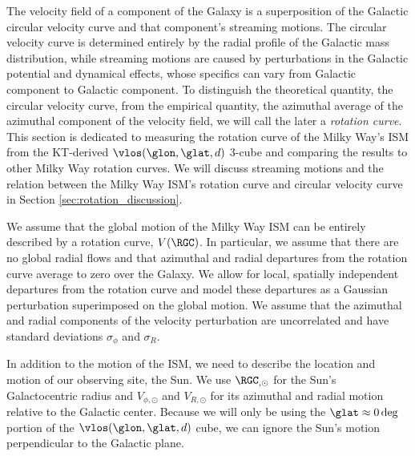 The velocity field of a component of the Galaxy is a superposition of the Galactic circular velocity curve and that component's streaming motions. 
The circular velocity curve is determined entirely by the radial profile of the Galactic mass distribution, while streaming motions are caused by perturbations in the Galactic potential and dynamical effects, whose specifics can vary from Galactic component to Galactic component. 
To distinguish the theoretical quantity, the circular velocity curve, from the empirical quantity, the azimuthal average of the azimuthal component of the velocity field, we will call the later a \emph{rotation curve}. 
This section is dedicated to measuring the rotation curve of the Milky Way's ISM from the KT-derived $\vlos(\glon, \glat, d)$ 3-cube and comparing the results to other Milky Way rotation curves. 
We will discuss streaming motions and the relation between the Milky Way ISM's rotation curve and circular velocity curve in Section \ref{sec:rotation_discussion}.

We assume that the global motion of the Milky Way ISM can be entirely described by a rotation curve, $V(\RGC)$. 
In particular, we assume that there are no global radial flows and that azimuthal and radial departures from the rotation curve average to zero over the Galaxy.
We allow for local, spatially independent departures from the rotation curve and model these departures as a Gaussian perturbation superimposed on the global motion. 
We assume that the azimuthal and radial components of the velocity perturbation are uncorrelated and have standard deviations $\sigma_\phi$ and $\sigma_R$.

In addition to the motion of the ISM, we need to describe the location and motion of our observing site, the Sun. 
We use $\RGC_{, \odot}$ for the Sun's Galactocentric radius and $V_{\phi, \odot}$ and $V_{R, \odot}$ for its azimuthal and radial motion relative to the Galactic center. 
Because we will only be using the $\glat \approx 0 \deg$ portion of the $\vlos(\glon, \glat, d)$ cube, we can ignore the Sun's motion perpendicular to the Galactic plane.

